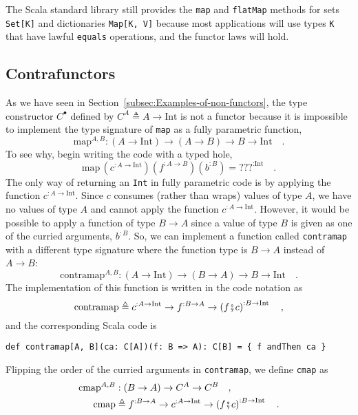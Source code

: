 The Scala standard library still provides the \lstinline!map! and
\lstinline!flatMap! methods for sets \lstinline!Set[K]! and dictionaries
\lstinline!Map[K, V]! because most applications will use types \lstinline!K!
that have lawful \lstinline!equals! operations, and the functor laws
will hold.

\subsection{Contrafunctors\label{subsec:Contrafunctors}}

As we have seen in Section~\ref{subsec:Examples-of-non-functors},
the type constructor $C^{\bullet}$ defined by $C^{A}\triangleq A\rightarrow\text{Int}$
is not a functor because it is impossible to implement the type signature
of \lstinline!map! as a fully parametric function,
\[
\text{map}^{A,B}:\left(A\rightarrow\text{Int}\right)\rightarrow\left(A\rightarrow B\right)\rightarrow B\rightarrow\text{Int}\quad.
\]
To see why, begin writing the code with a typed hole, 
\[
\text{map}\,(c^{:A\rightarrow\text{Int}})(f^{:A\rightarrow B})(b^{:B})=\text{???}^{:\text{Int}}\quad.
\]
The only way of returning an \lstinline!Int! in fully parametric
code is by applying the function $c^{:A\rightarrow\text{Int}}$. Since
$c$ consumes (rather than wraps) values of type $A$, we have no
values of type $A$ and cannot apply the function $c^{:A\rightarrow\text{Int}}$.
However, it would be possible to apply a function of type $B\rightarrow A$
since a value of type $B$ is given as one of the curried arguments,
$b^{:B}$. So, we can implement a function called \lstinline!contramap!
with a different type signature where the function type is $B\rightarrow A$
instead of $A\rightarrow B$: 
\[
\text{contramap}^{A,B}:\left(A\rightarrow\text{Int}\right)\rightarrow\left(B\rightarrow A\right)\rightarrow B\rightarrow\text{Int}\quad.
\]
The implementation of this function is written in the code notation
as
\[
\text{contramap}\triangleq c^{:A\rightarrow\text{Int}}\rightarrow f^{:B\rightarrow A}\rightarrow\left(f\bef c\right)^{:B\rightarrow\text{Int}}\quad,
\]
and the corresponding Scala code is
\begin{lstlisting}
def contramap[A, B](ca: C[A])(f: B => A): C[B] = { f andThen ca }
\end{lstlisting}
Flipping the order of the curried arguments in \lstinline!contramap!,
we define \lstinline!cmap! as
\begin{align}
\text{cmap}^{A,B} & :\left(B\rightarrow A\right)\rightarrow C^{A}\rightarrow C^{B}\quad,\nonumber \\
\text{cmap} & \triangleq f^{:B\rightarrow A}\rightarrow c^{:A\rightarrow\text{Int}}\rightarrow\left(f\bef c\right)^{:B\rightarrow\text{Int}}\quad.\label{eq:f-example-1-contrafmap}
\end{align}
